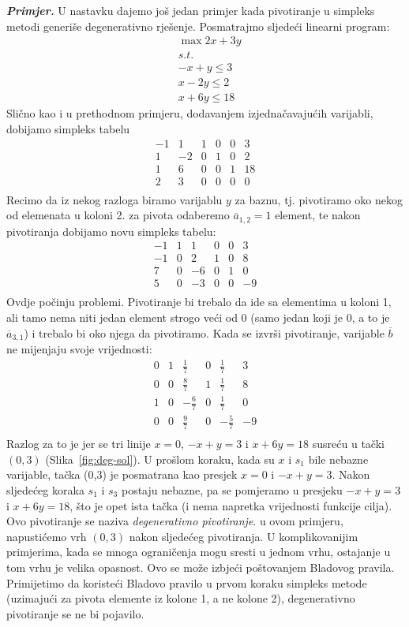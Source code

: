 \documentclass[a4paper, utf8, 11pt, colorlinks]{book}
\begin{document}
\emph{\textbf{Primjer.}} U nastavku dajemo još jedan primjer kada pivotiranje u simpleks metodi generiše degenerativno rješenje. 
Posmatrajmo sljedeći linearni program:
\begin{align*}
    &\max 2x + 3y \\
    & s.t. \\
	& -x + y \leq 3 \\
	& x - 2y \leq 2 \\
	& x + 6y \leq 18
\end{align*}
Slično kao i u prethodnom primjeru, dodavanjem izjednačavajućih varijabli, dobijamo simpleks 
tabelu 
$$\begin{array}{ccccc|c}
     -1 & 1 & 1 & 0 & 0 & 3 \\
      1 &-2 & 0 & 1 & 0 & 2 \\
      1 & 6 & 0 & 0 & 1 & 18 \\ \hline
      2 & 3 & 0 & 0 & 0 & 0 \\
\end{array}$$
Recimo da iz nekog razloga biramo varijablu $y$ za baznu, tj. pivotiramo oko nekog od elemenata u koloni 2. za pivota odaberemo $\overline{a}_{1,2}=1$ element, te nakon pivotiranja dobijamo novu simpleks tabelu:
$$\begin{array}{ccccc|c}
	-1 & 1 & 1 & 0 & 0 & 3 \\
    -1 & 0 & 2 & 1 & 0 & 8 \\
    7 & 0 & -6 & 0 & 1 & 0 \\ \hline
    5 & 0 & -3 & 0 & 0 & -9 \\
\end{array}$$
Ovdje počinju problemi. Pivotiranje bi trebalo da ide sa elementima u koloni 1, ali tamo nema niti jedan element strogo veći od 0 (samo jedan koji je 0, a to je $\overline{a}_{3,1}$) i trebalo bi oko njega da pivotiramo. Kada se izvrši pivotiranje, varijable $\overline{b}$ ne mijenjaju svoje vrijednosti:
$$\begin{array}{ccccc|c}
     0 & 1 & \frac{1}{7}  & 0 & \frac{1}{7} & 3 \\
     0 & 0 & \frac{8}{7}  & 1 & \frac{1}{7} & 8 \\
     1 & 0 & -\frac{6}{7} & 0 & \frac{1}{7} & 0 \\ \hline
     0 & 0 & \frac{9}{7}  & 0 & -\frac{5}{7} & -9 \\
\end{array}$$
Razlog za to je jer se tri linije $x=0$, $-x+y=3$ i $x+6y=18$ susreću u tački $(0,3)$ (Slika~\ref{fig:deg-sol}). U prošlom koraku, kada su $x$ i $s_1$ bile nebazne varijable, tačka (0,3) je posmatrana kao presjek $x=0$ i $-x +y =3$. Nakon sljedećeg koraka $s_1$ i $s_3$ postaju nebazne, pa se pomjeramo u presjeku 
$-x+y=3$ i $x+6y=18$, što je opet ista tačka (i nema napretka vrijednosti funkcije cilja). 
 Ovo pivotiranje se naziva \emph{degenerativno pivotiranje}. u ovom primjeru, napustićemo vrh $(0,3)$ nakon sljedećeg pivotiranja. U komplikovanijim primjerima, kada se mnoga ograničenja mogu sresti u jednom vrhu, ostajanje u tom vrhu je velika opasnost. Ovo se može izbjeći poštovanjem 
 Bladovog pravila. Primijetimo da koristeći Bladovo pravilo u prvom koraku simpleks metode (uzimajući za pivota elemente iz kolone 1, a ne kolone 2), degenerativno pivotiranje se ne bi pojavilo.  
\end{document}
